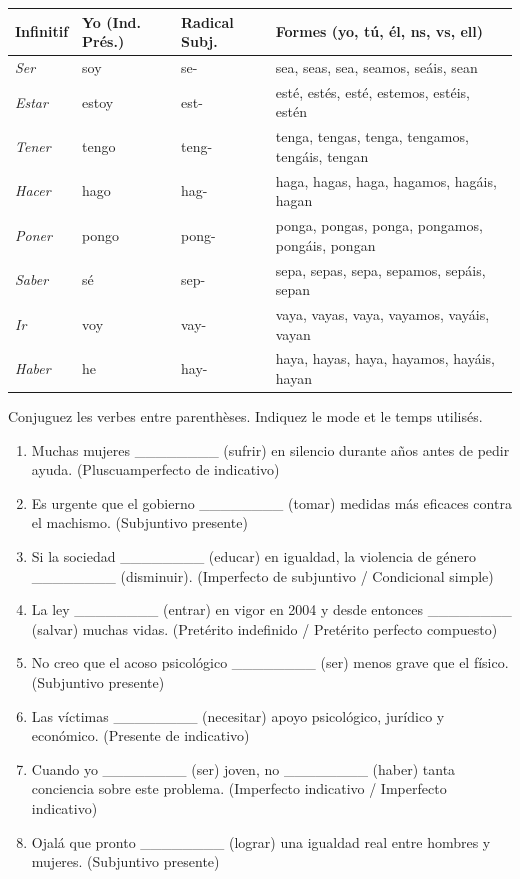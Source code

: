 \documentclass[11pt]{article}
\begin{document}
\begin{attention}
\begin{center}
\begin{tabular}{|l|l|l|l|}
\hline
\rowcolor{popblueL} \textbf{Infinitif} & \textbf{Yo (Ind. Prés.)} & \textbf{Radical Subj.} & \textbf{Formes (yo, tú, él, ns, vs, ell)} \\
\hline
\emph{Ser} & soy & se- & sea, seas, sea, seamos, seáis, sean \\
\hline
\emph{Estar} & estoy & est- & esté, estés, esté, estemos, estéis, estén \\
\hline
\emph{Tener} & tengo & teng- & tenga, tengas, tenga, tengamos, tengáis, tengan \\
\hline
\emph{Hacer} & hago & hag- & haga, hagas, haga, hagamos, hagáis, hagan \\
\hline
\emph{Poner} & pongo & pong- & ponga, pongas, ponga, pongamos, pongáis, pongan \\
\hline
\emph{Saber} & sé & sep- & sepa, sepas, sepa, sepamos, sepáis, sepan \\
\hline
\emph{Ir} & voy & vay- & vaya, vayas, vaya, vayamos, vayáis, vayan \\
\hline
\emph{Haber} & he & hay- & haya, hayas, haya, hayamos, hayáis, hayan \\
\hline
\end{tabular}
\end{center}
\end{attention}

\begin{exercice}
Conjuguez les verbes entre parenthèses. Indiquez le mode et le temps utilisés.
\begin{enumerate}
\item Muchas mujeres \_\_\_\_\_\_\_\_ (sufrir) en silencio durante años antes de pedir ayuda. (Pluscuamperfecto de indicativo)
\item Es urgente que el gobierno \_\_\_\_\_\_\_\_ (tomar) medidas más eficaces contra el machismo. (Subjuntivo presente)
\item Si la sociedad \_\_\_\_\_\_\_\_ (educar) en igualdad, la violencia de género \_\_\_\_\_\_\_\_ (disminuir). (Imperfecto de subjuntivo / Condicional simple)
\item La ley \_\_\_\_\_\_\_\_ (entrar) en vigor en 2004 y desde entonces \_\_\_\_\_\_\_\_ (salvar) muchas vidas. (Pretérito indefinido / Pretérito perfecto compuesto)
\item No creo que el acoso psicológico \_\_\_\_\_\_\_\_ (ser) menos grave que el físico. (Subjuntivo presente)
\item Las víctimas \_\_\_\_\_\_\_\_ (necesitar) apoyo psicológico, jurídico y económico. (Presente de indicativo)
\item Cuando yo \_\_\_\_\_\_\_\_ (ser) joven, no \_\_\_\_\_\_\_\_ (haber) tanta conciencia sobre este problema. (Imperfecto indicativo / Imperfecto indicativo)
\item Ojalá que pronto \_\_\_\_\_\_\_\_ (lograr) una igualdad real entre hombres y mujeres. (Subjuntivo presente)
\end{enumerate}
\end{exercice}
\end{document}
